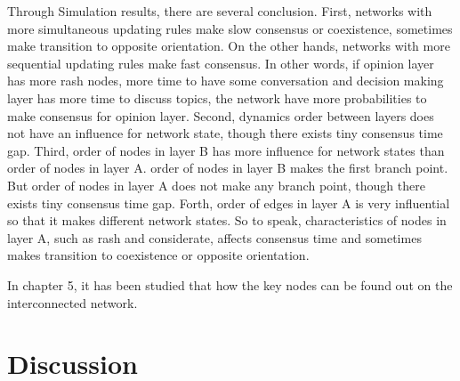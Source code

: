 Through Simulation results, there are several conclusion. First, networks with more simultaneous updating rules make slow consensus or coexistence, sometimes make transition to opposite orientation. On the other hands, networks with more sequential updating rules make fast consensus. In other words, if opinion layer has more rash nodes, more time to have some conversation and decision making layer has more time to  discuss topics, the network have more probabilities to make consensus for opinion layer. Second, dynamics order between layers does not have an influence for network state, though there exists tiny consensus time gap. Third, order of nodes in layer B has more influence for network states than order of nodes in layer A. order of nodes in layer B makes the first branch point. But order of nodes in layer A does not make any branch point, though there exists tiny consensus time gap. Forth, order of edges in layer A is very influential so that it makes different network states. So to speak, characteristics of nodes in layer A, such as rash and considerate, affects consensus time and sometimes makes transition to coexistence or opposite orientation. 



In chapter 5, it has been studied that how the key nodes can be found out on the interconnected network.

\section{Discussion} 